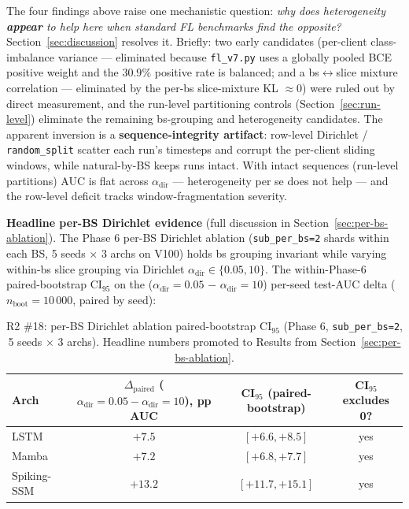 \documentclass[journal]{IEEEtran}
\newcommand{\alphadir}{\ensuremath{\alpha_{\mathrm{dir}}}}
\begin{document}
The four findings above raise one mechanistic question: \emph{why does heterogeneity \textbf{appear} to help here when standard FL benchmarks find the opposite?} Section~\ref{sec:discussion} resolves it. Briefly: two early candidates (per-client class-imbalance variance --- eliminated because \lstinline|fl_v7.py| uses a globally pooled BCE positive weight and the $30.9\%$ positive rate is balanced; and a bs$\leftrightarrow$slice mixture correlation --- eliminated by the per-bs slice-mixture KL $\approx 0$) were ruled out by direct measurement, and the run-level partitioning controls (Section~\ref{sec:run-level}) eliminate the remaining bs-grouping and heterogeneity candidates. The apparent inversion is a \textbf{sequence-integrity artifact}: row-level Dirichlet / \lstinline|random_split| scatter each run's timesteps and corrupt the per-client sliding windows, while natural-by-BS keeps runs intact. With intact sequences (run-level partitions) AUC is flat across $\alphadir$ --- heterogeneity per se does not help --- and the row-level deficit tracks window-fragmentation severity.

\textbf{Headline per-BS Dirichlet evidence} (full discussion in Section~\ref{sec:per-bs-ablation}). The Phase 6 per-BS Dirichlet ablation (\lstinline|sub_per_bs=2| shards within each BS, 5 seeds $\times$ 3 archs on V100) holds bs grouping invariant while varying within-bs slice grouping via Dirichlet $\alphadir \in \{0.05, 10\}$. The within-Phase-6 paired-bootstrap CI$_{95}$ on the ($\alphadir = 0.05$ $-$ $\alphadir = 10$) per-seed test-AUC delta ($n_{\mathrm{boot}}=10\,000$, paired by seed):

\begin{table}[t]
\centering
\caption{R2 \#18: per-BS Dirichlet ablation paired-bootstrap CI$_{95}$ (Phase 6, \lstinline|sub_per_bs=2|, 5 seeds $\times$ 3 archs). Headline numbers promoted to Results from Section~\ref{sec:per-bs-ablation}.}
\label{tab:per-bs-dirichlet-headline}
\begin{tabular}{@{}lccc@{}}
\toprule
Arch & $\Delta_{\mathrm{paired}}$ ($\alphadir=0.05 - \alphadir=10$), pp AUC & CI$_{95}$ (paired-bootstrap) & CI$_{95}$ excludes 0? \\
\midrule
LSTM        & $\mathbf{+7.5}$  & $[+6.6, +8.5]$    & yes \\
Mamba       & $\mathbf{+7.2}$  & $[+6.8, +7.7]$    & yes \\
Spiking-SSM & $\mathbf{+13.2}$ & $[+11.7, +15.1]$  & yes \\
\bottomrule
\end{tabular}
\end{table}
\end{document}
